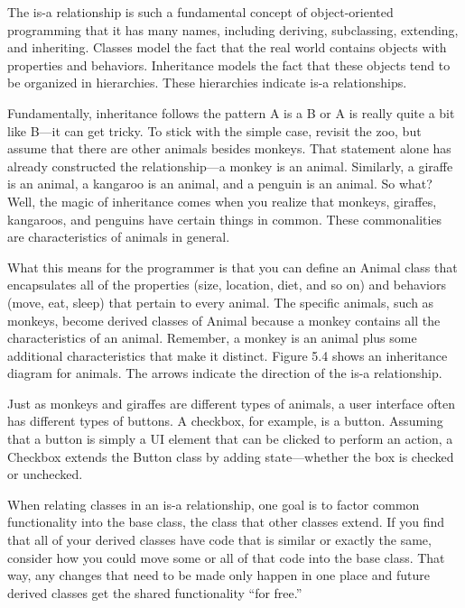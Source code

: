 
The is-a relationship is such a fundamental concept of object-oriented programming that it has many names, including deriving, subclassing, extending, and inheriting. Classes model the fact that the real world contains objects with properties and behaviors. Inheritance models the fact that these objects tend to be organized in hierarchies. These hierarchies indicate is-a relationships.

Fundamentally, inheritance follows the pattern A is a B or A is really quite a bit like B—it can get tricky. To stick with the simple case, revisit the zoo, but assume that there are other animals besides monkeys. That statement alone has already constructed the relationship—a monkey is an animal. Similarly, a giraffe is an animal, a kangaroo is an animal, and a penguin is an animal. So what? Well, the magic of inheritance comes when you realize that monkeys, giraffes, kangaroos, and penguins have certain things in common. These commonalities are characteristics of animals in general.

What this means for the programmer is that you can define an Animal class that encapsulates all of the properties (size, location, diet, and so on) and behaviors (move, eat, sleep) that pertain to every animal. The specific animals, such as monkeys, become derived classes of Animal because a monkey contains all the characteristics of an animal. Remember, a monkey is an animal plus some additional characteristics that make it distinct. Figure 5.4 shows an inheritance diagram for animals. The arrows indicate the direction of the is-a relationship.


Just as monkeys and giraffes are different types of animals, a user interface often has different types of buttons. A checkbox, for example, is a button.
Assuming that a button is simply a UI element that can be clicked to perform an action, a Checkbox extends the Button class by adding state—whether the box is checked or unchecked.

When relating classes in an is-a relationship, one goal is to factor common functionality into the base class, the class that other classes extend. If you find that all of your derived classes have code that is similar or exactly the same, consider how you could move some or all of that code into the base class. That way, any changes that need to be made only happen in one place and future derived classes get the shared functionality “for free.”

